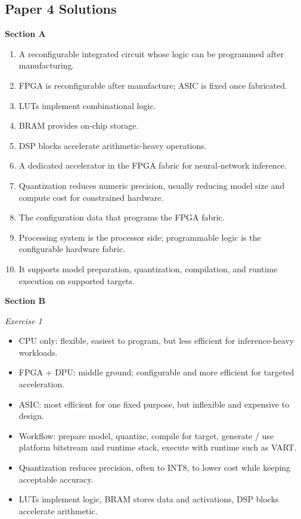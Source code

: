 \documentclass[11pt,a4paper]{article}
\begin{document}
\subsection*{Paper 4 Solutions}
\textbf{Section A}
\begin{enumerate}
\item A reconfigurable integrated circuit whose logic can be programmed after manufacturing.
\item FPGA is reconfigurable after manufacture; ASIC is fixed once fabricated.
\item LUTs implement combinational logic.
\item BRAM provides on-chip storage.
\item DSP blocks accelerate arithmetic-heavy operations.
\item A dedicated accelerator in the FPGA fabric for neural-network inference.
\item Quantization reduces numeric precision, usually reducing model size and compute cost for constrained hardware.
\item The configuration data that programs the FPGA fabric.
\item Processing system is the processor side; programmable logic is the configurable hardware fabric.
\item It supports model preparation, quantization, compilation, and runtime execution on supported targets.
\end{enumerate}

\textbf{Section B}

\textit{Exercise 1}
\begin{itemize}[leftmargin=1.5em]
\item CPU only: flexible, easiest to program, but less efficient for inference-heavy workloads.
\item FPGA + DPU: middle ground; configurable and more efficient for targeted acceleration.
\item ASIC: most efficient for one fixed purpose, but inflexible and expensive to design.
\item Workflow: prepare model, quantize, compile for target, generate / use platform bitstream and runtime stack, execute with runtime such as VART.
\item Quantization reduces precision, often to INT8, to lower cost while keeping acceptable accuracy.
\item LUTs implement logic, BRAM stores data and activations, DSP blocks accelerate arithmetic.
\end{itemize}
\end{document}
